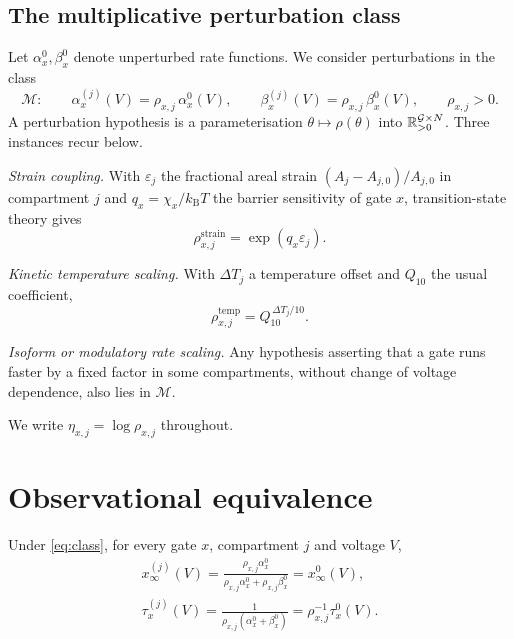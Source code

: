 \subsection{The multiplicative perturbation class}

Let $\alpha_x^{0},\beta_x^{0}$ denote unperturbed rate functions. We consider
perturbations in the class
\begin{equation}
\mathcal{M}:\qquad
\alpha_x^{(j)}(V)=\rho_{x,j}\,\alpha_x^{0}(V),
\qquad
\beta_x^{(j)}(V)=\rho_{x,j}\,\beta_x^{0}(V),
\qquad \rho_{x,j}>0.
\label{eq:class}
\end{equation}
A perturbation hypothesis is a parameterisation $\theta\mapsto\rho(\theta)$ into
$\mathbb{R}_{>0}^{\mathcal{G}\times N}$. Three instances recur below.

\emph{Strain coupling.} With $\varepsilon_j$ the fractional areal strain
$(A_j-A_{j,0})/A_{j,0}$ in compartment $j$ and $q_x=\chi_x/k_{\mathrm B}T$ the
barrier sensitivity of gate $x$, transition-state theory gives
\begin{equation}
\rho_{x,j}^{\mathrm{strain}}=\exp\!\left(q_x\varepsilon_j\right).
\label{eq:strain}
\end{equation}

\emph{Kinetic temperature scaling.} With $\Delta T_j$ a temperature offset and
$Q_{10}$ the usual coefficient,
\begin{equation}
\rho_{x,j}^{\mathrm{temp}}=Q_{10}^{\,\Delta T_j/10}.
\label{eq:q10}
\end{equation}

\emph{Isoform or modulatory rate scaling.} Any hypothesis asserting that a gate
runs faster by a fixed factor in some compartments, without change of voltage
dependence, also lies in $\mathcal{M}$.

We write $\eta_{x,j}=\log\rho_{x,j}$ throughout.

\section{Observational equivalence}
\label{sec:equiv}

\begin{proposition}
\label{prop:one}
Under \eqref{eq:class}, for every gate $x$, compartment $j$ and voltage $V$,
\begin{equation}
\begin{gathered}
x_\infty^{(j)}(V)=\frac{\rho_{x,j}\alpha_x^0}{\rho_{x,j}\alpha_x^0+\rho_{x,j}\beta_x^0}
=x_\infty^{0}(V),\\[2pt]
\tau_x^{(j)}(V)=\frac{1}{\rho_{x,j}\left(\alpha_x^0+\beta_x^0\right)}
=\rho_{x,j}^{-1}\tau_x^{0}(V).
\end{gathered}
\label{eq:invariance}
\end{equation}
\end{proposition}


